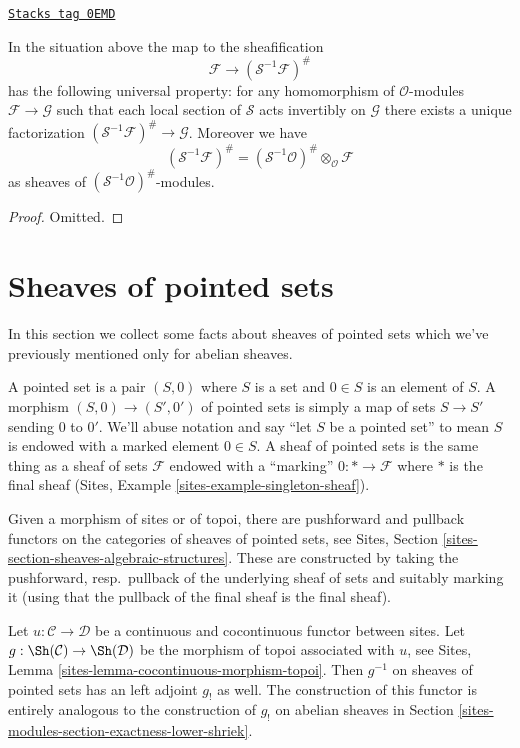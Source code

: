 \begin{lemma}
\label{sites-modules-lemma-simple-invert-module}
\href{https://stacks.math.columbia.edu/tag/0EMD}{\texttt{Stacks tag 0EMD}}

In the situation above the map to the sheafification
$$
\mathcal{F} \longrightarrow (\mathcal{S}^{-1}\mathcal{F})^\#
$$
has the following universal property: for any homomorphism
of $\mathcal{O}$-modules $\mathcal{F} \to \mathcal{G}$ such
that each local section of $\mathcal{S}$ acts invertibly on $\mathcal{G}$
there exists a unique factorization
$(\mathcal{S}^{-1}\mathcal{F})^\# \to \mathcal{G}$.
Moreover we have
$$
(\mathcal{S}^{-1}\mathcal{F})^\#
=
(\mathcal{S}^{-1}\mathcal{O})^\# \otimes_\mathcal{O} \mathcal{F}
$$
as sheaves of $(\mathcal{S}^{-1}\mathcal{O})^\#$-modules.
\end{lemma}

\begin{proof}
Omitted.
\end{proof}

\section{Sheaves of pointed sets}
\label{sites-modules-section-pointed}
In this section we collect some facts about sheaves of pointed sets
which we've previously mentioned only for abelian sheaves.

\medskip\noindent
A pointed set is a pair $(S, 0)$ where $S$ is a set and $0 \in S$
is an element of $S$. A morphism $(S, 0) \to (S', 0')$ of pointed sets
is simply a map of sets $S \to S'$ sending $0$ to $0'$. We'll abuse
notation and say ``let $S$ be a pointed set'' to mean $S$ is endowed
with a marked element $0 \in S$. A sheaf of pointed sets is
the same thing as a sheaf of sets $\mathcal{F}$ endowed with a
``marking'' $0 : * \to \mathcal{F}$ where $*$ is the final sheaf
(Sites, Example \ref{sites-example-singleton-sheaf}).

\medskip\noindent
Given a morphism of sites or of topoi, there are pushforward
and pullback functors on the categories of sheaves of pointed sets, see
Sites, Section \ref{sites-section-sheaves-algebraic-structures}.
These are constructed by taking the pushforward, resp.\ pullback
of the underlying sheaf of sets and suitably marking it (using
that the pullback of the final sheaf is the final sheaf).

\medskip\noindent
Let $u : \mathcal{C} \to \mathcal{D}$ be a continuous and cocontinuous
functor between sites. Let $g : \Sh(\mathcal{C}) \to \Sh(\mathcal{D})$
be the morphism of topoi associated with $u$, see
Sites, Lemma \ref{sites-lemma-cocontinuous-morphism-topoi}.
Then $g^{-1}$ on sheaves of pointed sets has an left adjoint $g_!$
as well. The construction of this functor is entirely analogous to
the construction of $g_!$ on abelian sheaves in
Section \ref{sites-modules-section-exactness-lower-shriek}.

